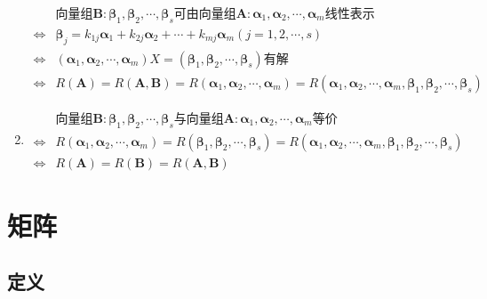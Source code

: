\documentclass[12pt]{book}
\begin{document}
\begin{enumerate}[1.]
          \begin{align*}
                              & \text{向量组}\bm{B}:\bm{\beta}_1,\bm{\beta}_2,\cdots,\bm{\beta}_s\text{可由向量组}\bm{A}:\bm{\alpha}_1,\bm{\alpha}_2,\cdots,\bm{\alpha}_{m}\text{线性表示}                    \\
              \Leftrightarrow & \bm{\beta}_j = k_{1j}\bm{\alpha}_1+k_{2j}\bm{\alpha}_2+\cdots+k_{mj}\bm{\alpha}_m (j=1,2,\cdots,s)                               \\
              \Leftrightarrow & (\bm{\alpha}_1,\bm{\alpha}_2,\cdots,\bm{\alpha}_{m})X = (\bm{\beta}_1,\bm{\beta}_2,\cdots,\bm{\beta}_s)\text{有解}                           \\
              \Leftrightarrow & R(\bm{A})=R(\bm{A},\bm{B}) = R(\bm{\alpha}_1,\bm{\alpha}_2,\cdots,\bm{\alpha}_{m})=R(\bm{\alpha}_1,\bm{\alpha}_2,\cdots,\bm{\alpha}_{m},\bm{\beta}_1,\bm{\beta}_2,\cdots,\bm{\beta}_s) 
          \end{align*}
    \item
          \begin{align*}
                              & \text{向量组}\bm{B}:\bm{\beta}_1,\bm{\beta}_2,\cdots,\bm{\beta}_s\text{与向量组}\bm{A}:\bm{\alpha}_1,\bm{\alpha}_2,\cdots,\bm{\alpha}_{m}\text{等价}                                                        \\
              \Leftrightarrow & R(\bm{\alpha}_1,\bm{\alpha}_2,\cdots,\bm{\alpha}_{m})=R(\bm{\beta}_1,\bm{\beta}_2,\cdots,\bm{\beta}_s)=R(\bm{\alpha}_1,\bm{\alpha}_2,\cdots,\bm{\alpha}_{m},\bm{\beta}_1,\bm{\beta}_2,\cdots,\bm{\beta}_s) \\
              \Leftrightarrow & R(\bm{A})=R(\bm{B})=R(\bm{A},\bm{B})
          \end{align*}
\end{enumerate}
























\section{矩阵}


\subsection{定义}
\end{document}
